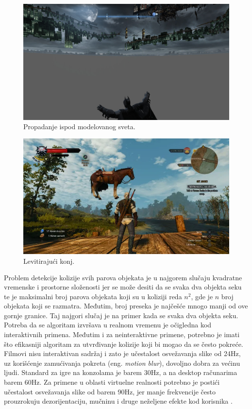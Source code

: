 \documentclass[12pt,oneside]{memoir}
\begin{document}
\begin{figure}[h!]
\centering
\includegraphics[scale=0.22]{batman.jpg}
\caption{Propadanje ispod modelovanog sveta.}
\label{fig:batman}
\end{figure}

\begin{figure}[h!]
	\centering
	\includegraphics[scale=0.54]{horse.png}
	\caption{Levitirajući konj.}
	\label{fig:horse}
\end{figure}

Problem detekcije kolizije svih parova objekata je u najgorem slučaju kvadratne vremenske i prostorne složenosti 
jer se može desiti da se svaka dva objekta seku te je maksimalni broj parova objekata koji su u koliziji reda $n^2$, 
gde je $n$ broj objekata koji se razmatra.
Međutim, broj preseka je najčešće mnogo manji od ove gornje granice.
Taj najgori slučaj je na primer kada se svaka dva objekta seku.
Potreba da se algoritam izvršava u realnom vremenu je očigledna kod interaktivnih primena.
Međutim i za neinteraktivne primene, potrebno je imati što efikasniji algoritam za utvrđivanje kolizije koji bi mogao da se često pokreće.
Filmovi nisu interaktivan sadržaj i zato je učestalost osvežavanja slike od 24Hz, uz korišćenje zamućivanja pokreta (eng. {\em motion blur}),
dovoljno dobra za većinu ljudi. Standard za igre na konzolama je barem 30Hz, a na desktop računarima  barem 60Hz. 
Za primene u oblasti virtuelne realnosti potrebno je postići učestalost osvežavanja slike od barem 90Hz, jer manje frekvencije često prouzrokuju
dezorijentaciju, mučninu i druge neželjene efekte kod korisnika \cite{importance}.
\end{document}

